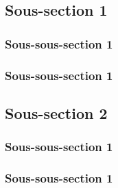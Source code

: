 \lipsum[1-2]%

\subsection{Sous-section 1}\label{subsec:1_2.1}

\lipsum[1-2]%

\subsubsection{Sous-sous-section 1}\label{subsubsec:1_2.1.1}

\lipsum[1-4]%

\subsubsection{Sous-sous-section 1}\label{subsubsec:1_2.1.2}

\lipsum[1-3]%

\subsection{Sous-section 2}\label{subsec:1_2.2}

\lipsum[1-3]%

\subsubsection{Sous-sous-section 1}\label{subsubsec:1_2.2.1}

\lipsum[1]%

\subsubsection{Sous-sous-section 1}\label{subsubsec:1_2.2.2}

